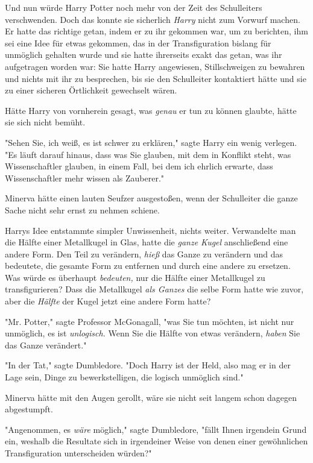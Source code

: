 {Und nun würde Harry Potter noch mehr von der Zeit des Schulleiters verschwenden. Doch das konnte sie sicherlich \emph{Harry} nicht zum Vorwurf machen. Er hatte das richtige getan, indem er zu ihr gekommen war, um zu berichten, ihm sei eine Idee für etwas gekommen, das in der Transfiguration bislang für unmöglich gehalten wurde und sie hatte ihrerseits exakt das getan, was ihr aufgetragen worden war: Sie hatte Harry angewiesen, Stillschweigen zu bewahren und nichts mit ihr zu besprechen, bis sie den Schulleiter kontaktiert hätte und sie zu einer sicheren Örtlichkeit gewechselt wären.

Hätte Harry von vornherein gesagt, was \emph{genau} er tun zu können glaubte, hätte sie sich nicht bemüht.

"Sehen Sie, ich weiß, es ist schwer zu erklären," sagte Harry ein wenig verlegen. "Es läuft darauf hinaus, dass was Sie glauben, mit dem in Konflikt steht, was Wissenschaftler glauben, in einem Fall, bei dem ich ehrlich erwarte, dass Wissenschaftler mehr wissen als Zauberer."

Minerva hätte einen lauten Seufzer ausgestoßen, wenn der Schulleiter die ganze Sache nicht sehr ernst zu nehmen schiene.

Harrys Idee entstammte simpler Unwissenheit, nichts weiter. Verwandelte man die Hälfte einer Metallkugel in Glas, hatte die \emph{ganze Kugel} anschließend eine andere Form. Den Teil zu verändern, \emph{hieß} das Ganze zu verändern und das bedeutete, die gesamte Form zu entfernen und durch eine andere zu ersetzen. Was würde es überhaupt \emph{bedeuten,} nur die Hälfte einer Metallkugel zu transfigurieren? Dass die Metallkugel \emph{als Ganzes} die selbe Form hatte wie zuvor, aber die \emph{Hälfte} der Kugel jetzt eine andere Form hatte?

"Mr. Potter," sagte Professor McGonagall, "was Sie tun möchten, ist nicht nur unmöglich, es ist \emph{unlogisch.} Wenn Sie die Hälfte von etwas verändern, \emph{haben} Sie das Ganze verändert."

"In der Tat," sagte Dumbledore. "Doch Harry ist der Held, also mag er in der Lage sein, Dinge zu bewerkstelligen, die logisch unmöglich sind."

Minerva hätte mit den Augen gerollt, wäre sie nicht seit langem schon dagegen abgestumpft.

"Angenommen, es \emph{wäre} möglich," sagte Dumbledore, "fällt Ihnen irgendein Grund ein, weshalb die Resultate sich in irgendeiner Weise von denen einer gewöhnlichen Transfiguration unterscheiden würden?"

}
